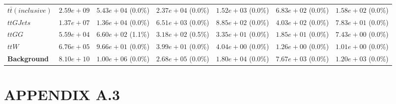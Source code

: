 \begin{landscape}
\begin{table}[h!]
\begin{tabular}{ |l|c|c|c|c|c|c| }
                    $t\bar{t} (inclusive)$ &  $2.59e+09$ &   $5.43e+04$ (0.0\%) &  $2.37e+04$ (0.0\%) &  $1.52e+03$ (0.0\%) &    $6.83e+02$ (0.0\%) &    $1.58e+02$ (0.0\%) \\
                                 $ttGJets$ &  $1.37e+07$ &   $1.36e+04$ (0.0\%) &  $6.51e+03$ (0.0\%) &  $8.85e+02$ (0.0\%) &    $4.03e+02$ (0.0\%) &    $7.83e+01$ (0.0\%) \\
                                    $ttGG$ &  $5.59e+04$ &   $6.60e+02$ (1.1\%) &  $3.18e+02$ (0.5\%) &  $3.35e+01$ (0.0\%) &    $1.85e+01$ (0.0\%) &    $7.43e+00$ (0.0\%) \\
                                     $ttW$ &  $6.76e+05$ &   $9.66e+01$ (0.0\%) &  $3.99e+01$ (0.0\%) &  $4.04e+00$ (0.0\%) &    $1.26e+00$ (0.0\%) &    $1.01e+00$ (0.0\%) \\
                       \textbf{Background} &  $8.10e+10$ &   $1.00e+06$ (0.0\%) &  $2.68e+05$ (0.0\%) &  $1.80e+04$ (0.0\%) &    $7.67e+03$ (0.0\%) &    $1.20e+03$ (0.0\%) \\
    \hline
\end{tabular}
\label{semileptonic_cutflow}
\end{table}
\end{landscape}


\section*{APPENDIX A.3}

